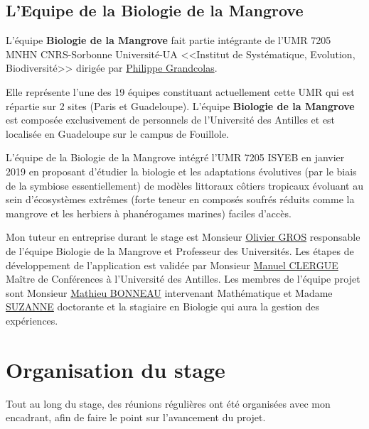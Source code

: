 
        \subsection{L'Equipe de la Biologie de la Mangrove}
        L'équipe \textbf{Biologie de la Mangrove} fait partie intégrante de l'UMR 7205 MNHN CNRS-Sorbonne Université-UA <<Institut de Systématique, Evolution, Biodiversité>> dirigée par \underline{Philippe Grandcolas}.

        \vspace{0.2cm}

        
        Elle représente l'une des 19 équipes constituant actuellement cette UMR qui est répartie sur 2 sites (Paris et Guadeloupe). L'équipe \textbf{Biologie de la Mangrove} est composée exclusivement de personnels de l'Université des Antilles et est localisée en Guadeloupe sur le campus de Fouillole.

        \vspace{0.2cm}
        
        L'équipe de la Biologie de la Mangrove intégré l'UMR 7205 ISYEB en janvier 2019 en proposant d'étudier la biologie et les adaptations évolutives (par le biais de la symbiose essentiellement) de modèles littoraux côtiers tropicaux évoluant au sein d'écosystèmes extrêmes (forte teneur en composés soufrés réduits comme la mangrove et les herbiers à phanérogames marines) faciles d'accès.
    
        \vspace{0.2cm}
    
        Mon tuteur en entreprise durant le stage est Monsieur \underline{Olivier GROS} responsable de l'équipe Biologie de la Mangrove et Professeur des Universités.
        Les étapes de développement de l'application est validée par Monsieur \underline{Manuel CLERGUE} Maître de Conférences à l'Université des Antilles.
        Les membres de l'équipe projet sont Monsieur \underline{Mathieu BONNEAU} intervenant Mathématique et Madame \underline{SUZANNE} doctorante et la stagiaire en Biologie qui aura la gestion des expériences.

    \section{Organisation du stage} 
    Tout au long du stage, des réunions régulières ont été organisées avec mon encadrant, afin de faire le point sur l'avancement du projet.

